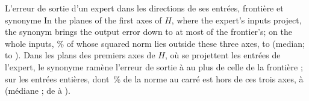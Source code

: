 %
{L'erreur de sortie d'un expert dans les directions de ses entrées, frontière et synonyme}
%
{In the planes of the first axes of $H$, where the expert's inputs project, the synonym brings the output error
down to at most \LatNuageConeRapport{} of the frontier's; on the whole inputs, \LatNuageHorsTrois\% of whose
squared norm lies outside these three axes, to \LatNuageEntreesMed{} (median; \LatNuageEntreesMin{} to
\LatNuageEntreesMax).}%
{Dans les plans des premiers axes de $H$, où se projettent les entrées de l'expert, le synonyme ramène l'erreur de
sortie à au plus \LatNuageConeRapport{} de celle de la frontière ; sur les entrées entières, dont \LatNuageHorsTrois\,\%
de la norme au carré est hors de ces trois axes, à \LatNuageEntreesMed{} (médiane ; de \LatNuageEntreesMin{} à
\LatNuageEntreesMax).}%
